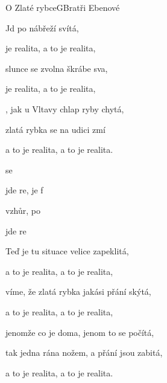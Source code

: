 \begin{song}{O Zlaté rybce}{G}{Bratři Ebenové}

\begin{SBVerse}

Jd po nábřeží   svítá,

 je realita, a to je realita,

slunce se zvolna škrábe  sva,

 je realita, a to je realita,

, jak u Vltavy  chlap ryby chytá,

 zlatá rybka se na udici zmí

a to je realita, a to je realita.

\end{SBVerse}

\begin{SBChorus}

 se   

 jde re,  je  f

 vzhůr,  po 

 jde re    

\end{SBChorus}

\begin{SBVerse}

Teď je tu situace velice zapeklitá,

a to je realita, a to je realita,

víme, že zlatá rybka jakási přání skýtá,

a to je realita, a to je realita,

jenomže co je doma, jenom to se počítá,

tak jedna rána nožem, a přání jsou zabitá,

a to je realita, a to je realita.

\end{SBVerse}

\begin{SBChorus}

\end{SBChorus}


\end{song}
